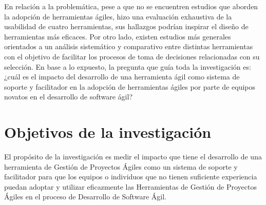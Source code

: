 En relación a la problemática, pese a que no se encuentren estudios que aborden la adopción de herramientas ágiles, \textcite{alomar:2016} hizo una evaluación exhaustiva de la usabilidad de cuatro herramientas, sus hallazgos podrían inspirar el diseño de herramientas más eficaces. Por otro lado, existen estudios más generales orientados a un análisis sistemático y comparativo entre distintas herramientas con el objetivo de facilitar los procesos de toma de decisiones relacionadas con su selección. En base a lo expuesto, la pregunta que guía toda la investigación es: ¿cuál es el impacto del desarrollo de una herramienta ágil como sistema de soporte y facilitador en la adopción de herramientas ágiles por parte de equipos novatos en el desarrollo de software ágil?

\section{Objetivos de la investigación}
El propósito de la investigación es medir el impacto que tiene el desarrollo de una herramienta de Gestión de Proyectos Ágiles como un sistema de soporte y facilitador para que los equipos o individuos que no tienen suficiente experiencia puedan adoptar y utilizar eficazmente las Herramientas de Gestión de Proyectos Ágiles en el proceso de Desarrollo de Software Ágil.